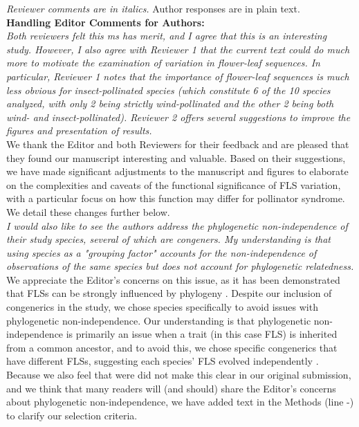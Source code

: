 \documentclass[11pt]{article}
\begin{document}
\emph{Reviewer comments are in italics.} Author responses are in plain text.\\

\textbf{Handling Editor Comments for Authors:}\\

\emph{Both reviewers felt this ms has merit, and I agree that this is an interesting study. However, I also agree with Reviewer 1 that the current text could do much more to motivate the examination of variation in flower-leaf sequences. In particular, Reviewer 1 notes that the importance of flower-leaf sequences is much less obvious for insect-pollinated species (which constitute 6 of the 10 species analyzed, with only 2 being strictly wind-pollinated and the other 2 being both wind- and insect-pollinated). Reviewer 2 offers several suggestions to improve the figures and presentation of results.}\\

\noindent We thank the Editor and both Reviewers for their feedback and are pleased that they found our manuscript interesting and valuable. Based on their suggestions, we have made significant adjustments to the manuscript and figures to elaborate on the complexities and caveats of the functional significance of FLS variation, with a particular focus on how this function may differ for pollinator syndrome. We detail these changes further below.\\

\emph{I would also like to see the authors address the phylogenetic non-independence of their study species, several of which are congeners. My understanding is that using species as a "grouping factor" accounts for the non-independence of observations of the same species but does not account for phylogenetic relatedness.}\\

\noindent We appreciate the Editor's concerns on this issue, as it has been demonstrated that FLSs can be strongly influenced by phylogeny \citep{Buonaiuto2020,Gougherty2018}. Despite our inclusion of congenerics in the study, we chose species specifically to avoid issues with phylogenetic non-independence. Our understanding is that phylogenetic non-independence is primarily an issue when a trait (in this case FLS) is inherited from a common ancestor, and to avoid this, we chose specific congenerics that have different FLSs, suggesting each species' FLS evolved independently \citep{Revell:2010aa}. Because we also feel that were did not make this clear in our original submission, and we think that many readers will (and should) share the Editor's concerns about phylogenetic non-independence, we have added text in the Methods (line -) to clarify our selection criteria.\\
\end{document}
